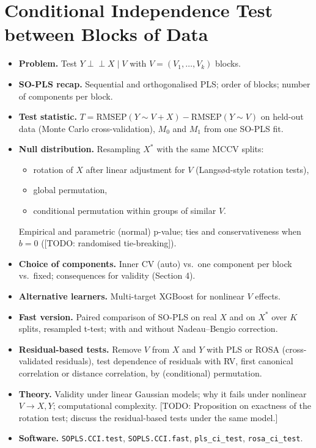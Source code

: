 \documentclass[10pt,leqno]{amsart}
\newcommand{\todo}[1]{{\color{red}[TODO: #1]}}
\newcommand{\ci}{\perp\!\!\!\perp}          %
\begin{document}
\section{Conditional Independence Test between Blocks of Data}
\begin{itemize}
\item \textbf{Problem.} Test $Y\ci X\mid V$ with $V=(V_1,\dots,V_k)$ blocks.
\item \textbf{SO-PLS recap.} Sequential and orthogonalised PLS; order of blocks;
  number of components per block.
\item \textbf{Test statistic.} $T=\mathrm{RMSEP}(Y\sim V+X)-\mathrm{RMSEP}(Y\sim V)$ on
  held-out data (Monte Carlo cross-validation), $M_0$ and $M_1$ from one SO-PLS fit.
\item \textbf{Null distribution.} Resampling $X^*$ with the same MCCV splits:
  \begin{itemize}
  \item rotation of $X$ after linear adjustment for $V$ (Langs{\o}d-style rotation
    tests),
  \item global permutation,
  \item conditional permutation within groups of similar $V$.
  \end{itemize}
  Empirical and parametric (normal) p-value; ties and conservativeness when
  $b=0$ (\todo{randomised tie-breaking}).
\item \textbf{Choice of components.} Inner CV (auto) vs.\ one component per
  block vs.\ fixed; consequences for validity (Section 4).
\item \textbf{Alternative learners.} Multi-target XGBoost for nonlinear $V$ effects.
\item \textbf{Fast version.} Paired comparison of SO-PLS on real $X$ and on $X^*$
  over $K$ splits, resampled t-test; with and without Nadeau--Bengio correction.
\item \textbf{Residual-based tests.} Remove $V$ from $X$ and $Y$ with PLS or ROSA
  (cross-validated residuals), test dependence of residuals with RV, first canonical
  correlation or distance correlation, by (conditional) permutation.
\item \textbf{Theory.} Validity under linear Gaussian models; why it fails under
  nonlinear $V\to X, Y$; computational complexity.
  \todo{Proposition on exactness of the rotation test; discuss the residual-based
  tests under the same model.}
\item \textbf{Software.} \texttt{SOPLS.CCI.test}, \texttt{SOPLS.CCI.fast},
  \texttt{pls\_ci\_test}, \texttt{rosa\_ci\_test}.
\end{itemize}
\end{document}
